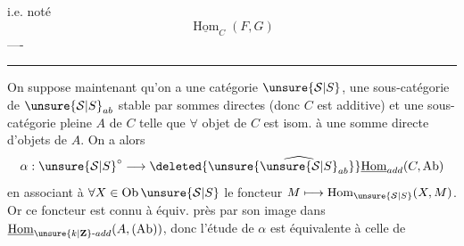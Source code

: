 i.e.
noté
\[
\underline{\operatorname{Hom}}_C(F,G)
\]
----
\par\bigskip\hrule\bigskip
On suppose maintenant qu'on a
une catégorie $\unsure{\mathcal{S}|S}$, une sous-catégorie
 de $\unsure{\mathcal{S}|S}_{ab}$ stable par sommes directes
(donc $C$ est additive) et une
sous-catégorie pleine $A$ de $C$ telle
que $\forall$ objet de $C$ est isom. à une
somme directe  d'objets de $A$.
On a alors 
\[
\alpha:\unsure{\mathcal{S}|S}^\circ\longrightarrow\deleted{\unsure{\widehat{\unsure{\mathcal{S}|S}}_{ab}}}
\underline{\operatorname{Hom}}_{add}(C,\mathrm{Ab})
\]
en associant à $\forall X\in\operatorname{Ob}\unsure{\mathcal{S}|S}$
le foncteur $M\longmapsto\operatorname{Hom}_{\unsure{\mathcal{S}|S}}(X,M)$.
Or ce foncteur est connu à équiv.
près par  son image
dans $\underline{\operatorname{Hom}}_{\unsure{k|\mathbf Z}\text{-}add}(A,(\mathrm{Ab}))$, donc l'étude
de $\alpha$ est équivalente à celle de
